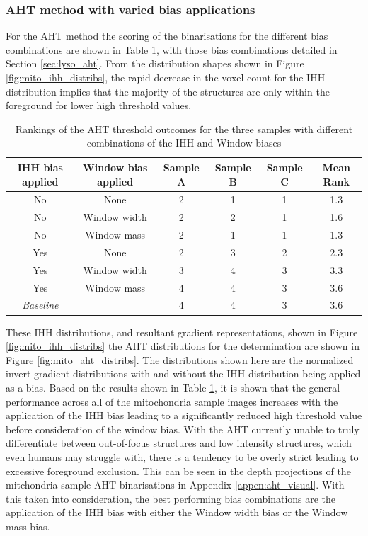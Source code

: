 \subsubsection{AHT method with varied bias applications}
For the AHT method the scoring of the binarisations for the different bias combinations are shown in Table \ref{tab:mito_aht}, with those bias combinations detailed in Section \ref{sec:lyso_aht}. From the distribution shapes shown in Figure \ref{fig:mito_ihh_distribs}, the rapid decrease in the voxel count for the IHH distribution implies that the majority of the structures are only within the foreground for lower high threshold values.
\begin{table}
	\centering
	\begin{tabular}{|c|c|c|c|c|c|}
		\hline
		IHH bias applied & Window bias applied & Sample A & Sample B & Sample C & Mean Rank \\
		\hline
		No & None & 2 & 1 & 1 & 1.3 \\
		\hline
		No & Window width & 2 & 2 & 1 & 1.6 \\
		\hline
		No & Window mass & 2 & 1 & 1 & 1.3 \\
		\hline
		Yes & None & 2 & 3 & 2 & 2.3 \\
		\hline
		Yes & Window width & 3 & 4 & 3 & 3.3 \\
		\hline
		Yes & Window mass & 4 & 4 & 3 & 3.6 \\
		\hline
		\textit{Baseline} & & 4 & 4 & 3 & 3.6\\
		\hline
	\end{tabular}
	\caption{Rankings of the AHT threshold outcomes for the three samples with different combinations of the IHH and Window biases}
	\label{tab:mito_aht}
\end{table}
These IHH distributions, and resultant gradient representations, shown in Figure \ref{fig:mito_ihh_distribs} the AHT distributions for the determination are shown in Figure \ref{fig:mito_aht_distribs}. The distributions shown here are the normalized invert gradient distributions with and without the IHH distribution being applied as a bias. Based on the results shown in Table \ref{tab:mito_aht}, it is shown that the general performance across all of the mitochondria sample images increases with the application of the IHH bias leading to a significantly reduced high threshold value before consideration of the window bias. With the AHT currently unable to truly differentiate between out-of-focus structures and low intensity structures, which even humans may struggle with, there is a tendency to be overly strict leading to excessive foreground exclusion. This can be seen in the depth projections of the mitchondria sample AHT binarisations in Appendix \ref{appen:aht_visual}. With this taken into consideration, the best performing bias combinations are the application of the IHH bias with either the Window width bias or the Window mass bias.
